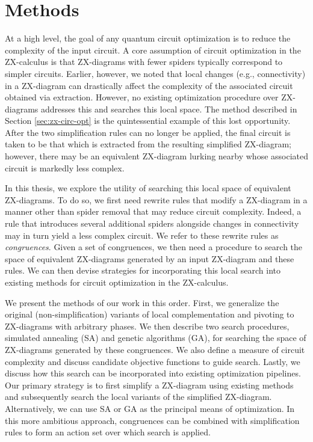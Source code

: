 \chapter[Methods]{Methods} \label{ch:methods}

At a high level, the goal of any quantum circuit optimization is to reduce the complexity of the input circuit.
A core assumption of circuit optimization in the ZX-calculus is that ZX-diagrams with fewer spiders typically correspond to simpler circuits.
Earlier, however, we noted that local changes (e.g., connectivity) in a ZX-diagram can drastically affect the complexity of the associated circuit obtained via extraction.
However, no existing optimization procedure over ZX-diagrams addresses this and searches this local space.
The  method described in Section \ref{sec:zx-circ-opt} is the quintessential example of this lost opportunity.
After the two simplification rules can no longer be applied, the final circuit is taken to be that which is extracted from the resulting simplified ZX-diagram;
however, there may be an equivalent ZX-diagram lurking nearby whose associated circuit is markedly less complex.

In this thesis, we explore the utility of searching this local space of equivalent ZX-diagrams.
To do so, we first need rewrite rules that modify a ZX-diagram in a manner other than spider removal that may reduce circuit complexity.
Indeed, a rule that introduces several additional spiders alongside changes in connectivity may in turn yield a less complex circuit.
We refer to these rewrite rules as \emph{congruences}.
Given a set of congruences, we then need a procedure to search the space of equivalent ZX-diagrams generated by an input ZX-diagram and these rules.
We can then devise strategies for incorporating this local search into existing methods for circuit optimization in the ZX-calculus.

We present the methods of our work in this order.
First, we generalize the original (non-simplification) variants of local complementation and pivoting to ZX-diagrams with arbitrary phases.
We then describe two search procedures, simulated annealing (SA) and genetic algorithms (GA), for searching the space of ZX-diagrams generated by these congruences.
We also define a measure of circuit complexity and discuss candidate objective functions to guide search. %
Lastly, we discuss how this search can be incorporated into existing optimization pipelines.
Our primary strategy is to first simplify a ZX-diagram using existing methods and subsequently search the local variants of the simplified ZX-diagram.
Alternatively, we can use SA or GA as the principal means of optimization.
In this more ambitious approach, congruences can be combined with simplification rules to form an action set over which search is applied.

